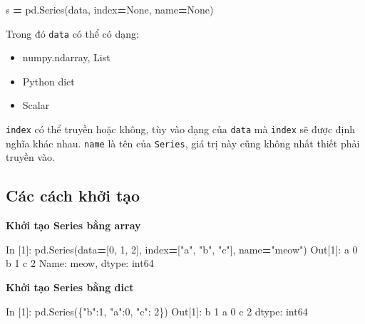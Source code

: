 \documentclass[
]{book}
\newenvironment{Shaded}{\begin{snugshade}}{\end{snugshade}}
\newcommand{\DecValTok}[1]{\textcolor[rgb]{0.00,0.00,0.81}{#1}}
\newcommand{\NormalTok}[1]{#1}
\newcommand{\OperatorTok}[1]{\textcolor[rgb]{0.81,0.36,0.00}{\textbf{#1}}}
\newcommand{\StringTok}[1]{\textcolor[rgb]{0.31,0.60,0.02}{#1}}
\newcommand{\VariableTok}[1]{\textcolor[rgb]{0.00,0.00,0.00}{#1}}
\begin{document}
\begin{Shaded}
\begin{Highlighting}[]
\NormalTok{s }\OperatorTok{=}\NormalTok{ pd.Series(data, index}\OperatorTok{=}\VariableTok{None}\NormalTok{, name}\OperatorTok{=}\VariableTok{None}\NormalTok{)}
\end{Highlighting}
\end{Shaded}

Trong đó \texttt{data} có thể có dạng:

\begin{itemize}
\item
  numpy.ndarray, List
\item
  Python dict
\item
  Scalar
\end{itemize}

\texttt{index} có thể truyền hoặc không, tùy vào dạng của \texttt{data} mà \texttt{index} sẽ được định nghĩa khác nhau.
\texttt{name} là tên của \texttt{Series}, giá trị này cũng không nhất thiết phải truyền vào.

\hypertarget{cuxe1c-cuxe1ch-khux1edfi-tux1ea1o}{%
\subsection*{Các cách khởi tạo}\label{cuxe1c-cuxe1ch-khux1edfi-tux1ea1o}}

\textbf{Khởi tạo Series bằng array}

\begin{Shaded}
\begin{Highlighting}[]
\NormalTok{In [}\DecValTok{1}\NormalTok{]: pd.Series(data}\OperatorTok{=}\NormalTok{[}\DecValTok{0}\NormalTok{, }\DecValTok{1}\NormalTok{, }\DecValTok{2}\NormalTok{], index}\OperatorTok{=}\NormalTok{[}\StringTok{"a"}\NormalTok{, }\StringTok{"b"}\NormalTok{, }\StringTok{"c"}\NormalTok{], name}\OperatorTok{=}\StringTok{"meow"}\NormalTok{)}
\NormalTok{Out[}\DecValTok{1}\NormalTok{]:}
\NormalTok{a    }\DecValTok{0}
\NormalTok{b    }\DecValTok{1}
\NormalTok{c    }\DecValTok{2}
\NormalTok{Name: meow, dtype: int64}
\end{Highlighting}
\end{Shaded}

\textbf{Khởi tạo Series bằng dict}

\begin{Shaded}
\begin{Highlighting}[]
\NormalTok{In [}\DecValTok{1}\NormalTok{]: pd.Series(\{}\StringTok{"b"}\NormalTok{:}\DecValTok{1}\NormalTok{, }\StringTok{"a"}\NormalTok{:}\DecValTok{0}\NormalTok{, }\StringTok{"c"}\NormalTok{: }\DecValTok{2}\NormalTok{\})}
\NormalTok{Out[}\DecValTok{1}\NormalTok{]: }
\NormalTok{b    }\DecValTok{1}
\NormalTok{a    }\DecValTok{0}
\NormalTok{c    }\DecValTok{2}
\NormalTok{dtype: int64}
\end{Highlighting}
\end{Shaded}
\end{document}
